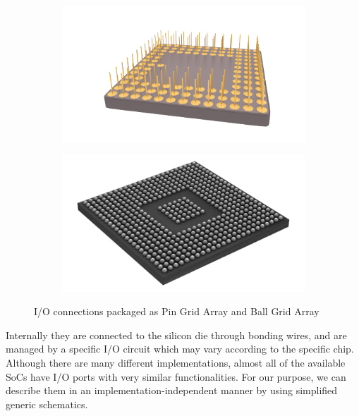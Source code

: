 \begin{figure}[h]
\centering

\begin{subfigure}{.45\textwidth}
\centering
\includegraphics[width=\linewidth]{res/pins}
\caption{\label{fig:pins}}
\end{subfigure}
\begin{subfigure}{.45\textwidth}
\centering
\includegraphics[width=\linewidth]{res/balls}
\caption{\label{fig:balls}}
\end{subfigure}

\caption{I/O connections packaged as  Pin Grid Array and  Ball Grid Array\label{fig:chips}}
\end{figure}

Internally they are connected to the silicon die through bonding wires, and are managed by a specific I/O circuit which may vary according to the specific chip.
Although there are many different implementations, almost all of the available SoCs have I/O ports with very similar functionalities.
For our purpose, we can describe them in an implementation-independent manner by using simplified generic schematics.



